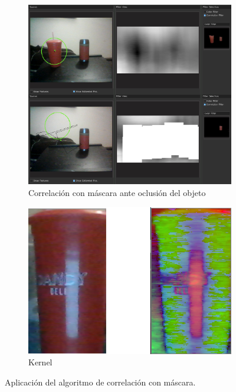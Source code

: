 \begin{figure}[H]
\centering

		\begin{subfigure}{.5\textwidth}
		\centering
		\includegraphics[width=1\textwidth]{Imagenes/corrmask.png}
		\caption{Correlación con máscara ante oclusión del objeto}
		\label{fig:sqdiff}
	\end{subfigure}
	\begin{subfigure}{.1\textwidth}
		\centering
		\includegraphics[width=1\textwidth]{Imagenes/kernelhsv.png}
		\caption{Kernel}
		\label{fig:kernel}
	\end{subfigure}
	\caption{Aplicación del algoritmo de correlación con máscara.}
	\label{fig:corrtest}
\end{figure}

